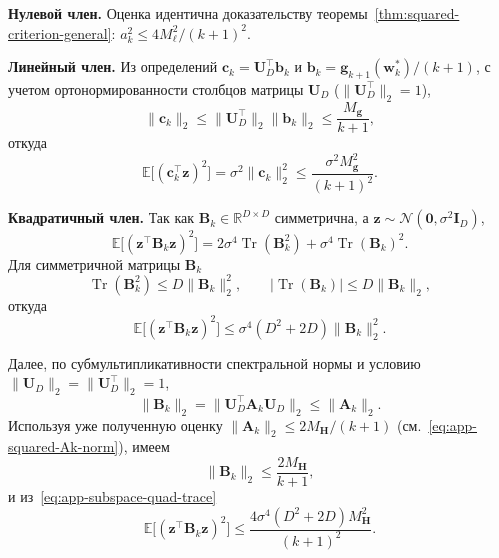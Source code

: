 \textbf{Нулевой член.} Оценка идентична доказательству теоремы~\ref{thm:squared-criterion-general}: $a_k^2 \leqslant 4M_\ell^2/(k+1)^2$.

\textbf{Линейный член.} Из определений $\mathbf c_k = \mathbf U_D^\top \mathbf b_k$ и $\mathbf b_k = \mathbf g_{k+1}(\mathbf w_k^*)/(k+1)$, с учетом ортонормированности столбцов матрицы $\mathbf U_D$ ($\|\mathbf U_D^\top\|_2 = 1$),
\begin{equation}
    \|\mathbf c_k\|_2
    \leqslant
    \|\mathbf U_D^\top\|_2 \|\mathbf b_k\|_2
    \leqslant
    \frac{M_{\mathbf g}}{k+1},
\end{equation}
откуда
\begin{equation}
    \label{eq:app-subspace-linear}
    \mathbb E\big[(\mathbf c_k^\top \mathbf z)^2\big]
    =
    \sigma^2 \|\mathbf c_k\|_2^2
    \leqslant
    \frac{\sigma^2 M_{\mathbf g}^2}{(k+1)^2}.
\end{equation}

\textbf{Квадратичный член.} Так как $\mathbf B_k \in \mathbb R^{D\times D}$ симметрична, а $\mathbf z \sim \mathcal N(\mathbf 0,\sigma^2 \mathbf I_D)$,
\begin{equation}
    \mathbb E\big[(\mathbf z^\top \mathbf B_k \mathbf z)^2\big]
    =
    2\sigma^4 \operatorname{Tr}(\mathbf B_k^2) + \sigma^4 \operatorname{Tr}(\mathbf B_k)^2.
\end{equation}
Для симметричной матрицы $\mathbf B_k$
\begin{equation}
    \operatorname{Tr}(\mathbf B_k^2) \leqslant D\|\mathbf B_k\|_2^2,
    \qquad
    |\operatorname{Tr}(\mathbf B_k)| \leqslant D\|\mathbf B_k\|_2,
\end{equation}
откуда
\begin{equation}
    \label{eq:app-subspace-quad-trace}
    \mathbb E\big[(\mathbf z^\top \mathbf B_k \mathbf z)^2\big]
    \leqslant
    \sigma^4(D^2+2D)\|\mathbf B_k\|_2^2.
\end{equation}

Далее, по субмультипликативности спектральной нормы и условию $\|\mathbf U_D\|_2 = \|\mathbf U_D^\top\|_2 = 1$,
\begin{equation}
    \|\mathbf B_k\|_2
    =
    \|\mathbf U_D^\top \mathbf A_k \mathbf U_D\|_2
    \leqslant
    \|\mathbf A_k\|_2.
\end{equation}
Используя уже полученную оценку $\|\mathbf A_k\|_2 \leqslant 2M_{\mathbf H}/(k+1)$ (см.~\eqref{eq:app-squared-Ak-norm}), имеем
\begin{equation}
    \|\mathbf B_k\|_2 \leqslant \frac{2M_{\mathbf H}}{k+1},
\end{equation}
и из~\eqref{eq:app-subspace-quad-trace}
\begin{equation}
    \label{eq:app-subspace-quadratic}
    \mathbb E\big[(\mathbf z^\top \mathbf B_k \mathbf z)^2\big]
    \leqslant
    \frac{4\sigma^4(D^2+2D)M_{\mathbf H}^2}{(k+1)^2}.
\end{equation}

